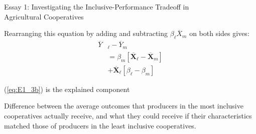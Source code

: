 \documentclass[aspectratio=169]{beamer}
\newenvironment{wideitemize}{\itemize\addtolength{\itemsep}{10pt}}{\enditemize}
\begin{document}
\begin{frame}{Essay 1: Investigating the Inclusive-Performance Tradeoff in \\ \hspace{1.7cm} Agricultural Cooperatives}
    \begin{wideitemize}
        \item Rearranging this equation by adding and subtracting $\beta_{\ell}\overline{X}_{m}$ on both sides gives: \vspace{.25cm}
            \begin{subequations}
                \begin{align}
                \overline{Y}&_{\ell} - \overline{Y}_{m} \label{eq:E1_3a} \\
                &= \beta_{m}[\overline{\mathbf{X}}_{\ell} - \overline{\mathbf{X}}_{m}] \label{eq:E1_3b} \\
                &+ \overline{\mathbf{X}}_{\ell}[\beta_{\ell} - \beta_{m}] \label{eq:E1_3c}
                \end{align}
            \end{subequations}  
        \item (\ref{eq:E1_3b}) is the explained component \vspace{.25cm}
            \begin{wideitemize}
                \item Difference between the average outcomes that producers in the most inclusive cooperatives actually receive, and what they could receive if their characteristics matched those of producers in the least inclusive cooperatives.
            \end{wideitemize}
    \end{wideitemize}    
\end{frame}
\end{document}
